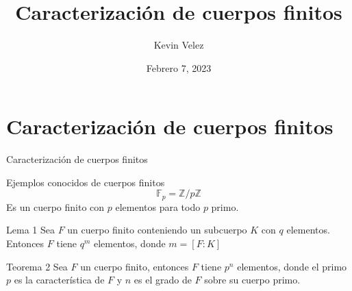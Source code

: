 \documentclass[presentation]{beamer}
\title{Caracterización de cuerpos finitos}
\author{Kevin Velez}
\institute{Universidad del Valle}
\date{Febrero 7, 2023}
\newcommand{\F}{\mathds{F}}
\newcommand{\Z}{\mathds{Z}}
\begin{document}
\section{Caracterización de cuerpos finitos}
\begin{frame}
\maketitle
\end{frame}

\begin{frame}{Caracterización de cuerpos finitos}
  \begin{block}{Ejemplos conocidos de cuerpos finitos}
    \begin{equation*}
      \F_p = \Z / p\Z
    \end{equation*}
    Es un cuerpo finito con $p$ elementos para todo $p$ primo.
  \end{block}
\end{frame}

\begin{frame}
  \begin{block}{Lema 1}
    Sea $F$ un cuerpo finito conteniendo un subcuerpo $K$ con $q$ elementos. Entonces $F$ tiene $q^m$ elementos, donde $ m = [F : K] $ 

    \begin{figure}[H]
      \centering
    \end{figure}
  \end{block}
\end{frame}


\begin{frame}
  \begin{block}{Teorema 2}
    Sea $F$ un cuerpo finito, entonces $F$ tiene $p^n$ elementos, donde el primo $p$ es la característica de $F$ y $n$ es el grado de $F$ sobre su cuerpo primo.

    \begin{figure}[H]
      \centering
    \end{figure}
  \end{block}
\end{frame}
\end{document}
